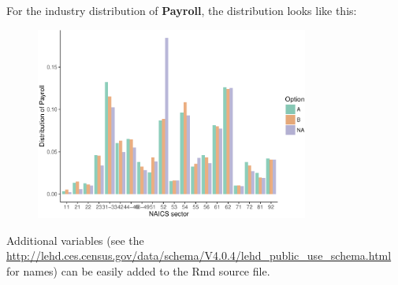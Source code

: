 \documentclass[]{article}
\begin{document}
For the industry distribution of \textbf{Payroll}, the distribution
looks like this:
\begin{figure}
\centering
\includegraphics[width=0.8\textwidth]{s2014_availability_files/figure-latex/graph_Payroll-1.pdf}
\end{figure}

Additional variables (see the
\href{LEHD\%20Schema}{\url{http://lehd.ces.census.gov/data/schema/V4.0.4/lehd_public_use_schema.html}}
for names) can be easily added to the Rmd source file.
\end{document}

